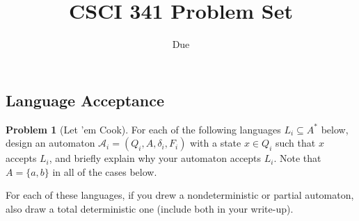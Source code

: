 \documentclass[11pt]{article}
\title{CSCI 341 Problem Set \pset}
\author{\subtitle}
\date{Due
    \duedate
}
\theoremstyle{theorem} %
\theoremstyle{definition} %
\newtheorem{problem}                    {{\color{BurntOrange}Problem}}
\theoremstyle{remark} %
\begin{document}
\maketitle


\subsection*{Language Acceptance}

\begin{problem}
    [Let 'em Cook]
    For each of the following languages \(L_i \subseteq A^*\) below, design an automaton \(\mathcal A_i = (Q_i, A, \delta_i, F_i)\) with a state \(x \in Q_i\) such that \(x\) accepts \(L_i\), and briefly explain why your automaton accepts \(L_i\).
    Note that \(A = \{a, b\}\) in all of the cases below.
    For each of these languages, if you drew a nondeterministic or partial automaton, also draw a total deterministic one (include both in your write-up).
\end{problem}

\end{document}
